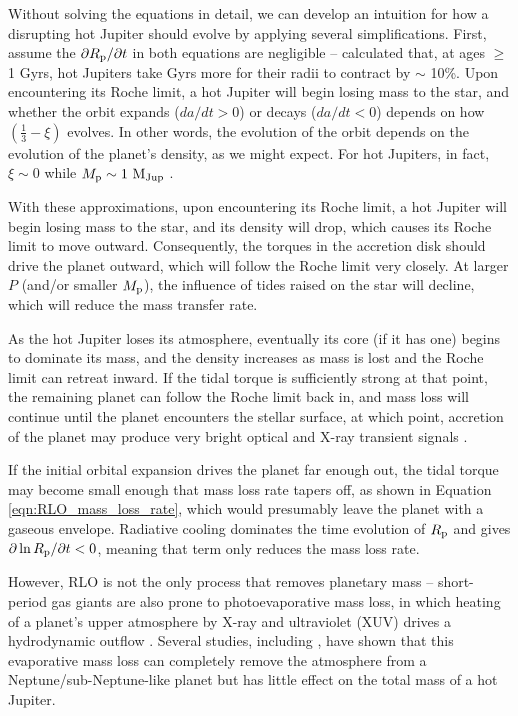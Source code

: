 \documentclass{svjour3}                     %
\begin{document}
Without solving the equations in detail, we can develop an intuition for how a disrupting hot Jupiter should evolve by applying several simplifications. First, assume the $\partial R_{\rm p}/\partial t$ in both equations are negligible -- \cite{Arras2006Thermal} calculated that, at ages $\geq$ 1 Gyrs, hot Jupiters take Gyrs more for their radii to contract by $\sim$ 10\%. Upon encountering its Roche limit, a hot Jupiter will begin losing mass to the star, and whether the orbit expands ($da/dt > 0$) or decays ($da/dt < 0$) depends on how $\left( \frac{1}{3} - \xi \right)$ evolves. In other words, the evolution of the orbit depends on the evolution of the planet's density, as we might expect. For hot Jupiters, in fact, $\xi \sim 0$ while $M_{\rm p} \sim 1\ {\rm M_{Jup}}$ \cite{Fortney2007Planetary}. 

With these approximations, upon encountering its Roche limit, a hot Jupiter will begin losing mass to the star, and its density will drop, which causes its Roche limit to move outward. Consequently, the torques in the accretion disk should drive the planet outward, which will follow the Roche limit very closely. At larger $P$ (and/or smaller $M_{\rm p}$), the influence of tides raised on the star will decline, which will reduce the mass transfer rate. 

As the hot Jupiter loses its atmosphere, eventually its core (if it has one) begins to dominate its mass, and the density increases as mass is lost and the Roche limit can retreat inward. If the tidal torque is sufficiently strong at that point, the remaining planet can follow the Roche limit back in, and mass loss will continue until the planet encounters the stellar surface, at which point, accretion of the planet may produce very bright optical and X-ray transient signals \cite{2012MNRAS.425.2778M}. 

If the initial orbital expansion drives the planet far enough out, the tidal torque may become small enough that mass loss rate tapers off, as shown in Equation \ref{eqn:RLO_mass_loss_rate}, which would presumably leave the planet with a gaseous envelope. Radiative cooling dominates the time evolution of $R_{\rm p}$ and gives $\partial \ln R_{\rm p}/\partial t < 0$, meaning that term only reduces the mass loss rate.

However, RLO is not the only process that removes planetary mass -- short-period gas giants are also prone to photoevaporative mass loss, in which heating of a planet's upper atmosphere by X-ray and ultraviolet (XUV) drives a hydrodynamic outflow  \cite{VidalMadjar2003Extended}. Several studies, including \cite{Lopez2013Role}, have shown that this evaporative mass loss can completely remove the atmosphere from a Neptune/sub-Neptune-like planet but has little effect on the total mass of a hot Jupiter. 
\end{document}

